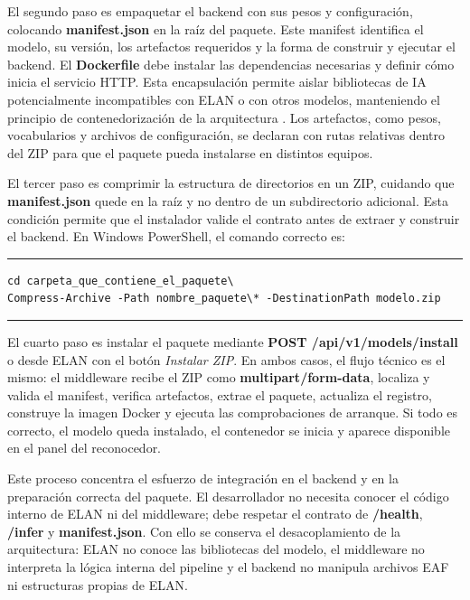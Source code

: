 \documentclass[11pt,a4paper]{article}
\begin{document}
El segundo paso es empaquetar el backend con sus pesos y configuración, colocando \textbf{manifest.json} en la raíz del paquete. Este manifest identifica el modelo, su versión, los artefactos requeridos y la forma de construir y ejecutar el backend. El \textbf{Dockerfile} debe instalar las dependencias necesarias y definir cómo inicia el servicio HTTP. Esta encapsulación permite aislar bibliotecas de IA potencialmente incompatibles con ELAN o con otros modelos, manteniendo el principio de contenedorización de la arquitectura \cite{docker2026overview}. Los artefactos, como pesos, vocabularios y archivos de configuración, se declaran con rutas relativas dentro del ZIP para que el paquete pueda instalarse en distintos equipos.

El tercer paso es comprimir la estructura de directorios en un ZIP, cuidando que \textbf{manifest.json} quede en la raíz y no dentro de un subdirectorio adicional. Esta condición permite que el instalador valide el contrato antes de extraer y construir el backend. En Windows PowerShell, el comando correcto es:

\begin{center}
\begin{minipage}{0.78\textwidth}
\hrule
\vspace{0.08cm}
\footnotesize
\begin{Verbatim}[baselinestretch=0.78]
cd carpeta_que_contiene_el_paquete\
Compress-Archive -Path nombre_paquete\* -DestinationPath modelo.zip
\end{Verbatim}
\vspace{0.03cm}
\hrule

\label{lst:comprimir_modelo_zip}
\end{minipage}
\end{center}

El cuarto paso es instalar el paquete mediante \textbf{POST /api/v1/models/install} o desde ELAN con el botón \textit{Instalar ZIP}. En ambos casos, el flujo técnico es el mismo: el middleware recibe el ZIP como \textbf{multipart/form-data}, localiza y valida el manifest, verifica artefactos, extrae el paquete, actualiza el registro, construye la imagen Docker y ejecuta las comprobaciones de arranque. Si todo es correcto, el modelo queda instalado, el contenedor se inicia y aparece disponible en el panel del reconocedor.

Este proceso concentra el esfuerzo de integración en el backend y en la preparación correcta del paquete. El desarrollador no necesita conocer el código interno de ELAN ni del middleware; debe respetar el contrato de \textbf{/health}, \textbf{/infer} y \textbf{manifest.json}. Con ello se conserva el desacoplamiento de la arquitectura: ELAN no conoce las bibliotecas del modelo, el middleware no interpreta la lógica interna del pipeline y el backend no manipula archivos EAF ni estructuras propias de ELAN.
\end{document}
